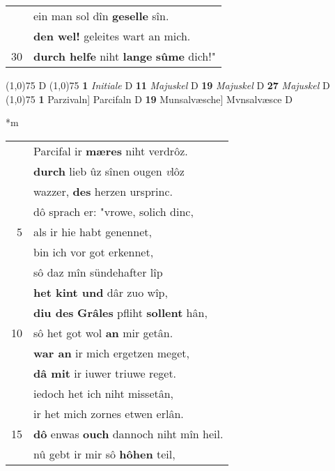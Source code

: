 \documentclass[8pt,a4paper,notitlepage]{article}
\begin{document}
\begin{table}[ht]
\begin{minipage}[t]{0.5\linewidth}
\begin{tabular}{rl}
 & ein man sol dîn \textbf{geselle} sîn.\\ 
 & \textbf{den wel!} geleites wart an mich.\\ 
30 & \textbf{durch helfe} niht \textbf{lange} \textbf{sûme} dich!"\\ 
\end{tabular}
\scriptsize
\line(1,0){75} \newline
D \newline
\line(1,0){75} \newline
\textbf{1} \textit{Initiale} D  \textbf{11} \textit{Majuskel} D  \textbf{19} \textit{Majuskel} D  \textbf{27} \textit{Majuskel} D  \newline
\line(1,0){75} \newline
\textbf{1} Parzivaln] Parcifaln D \textbf{19} Munsalvæsche] Mvnsalvæsce D \newline
\end{minipage}
\hspace{0.5cm}
\begin{minipage}[t]{0.5\linewidth}
\small
\begin{center}*m
\end{center}
\begin{tabular}{rl}
 & Parcifal ir \textbf{mæres} niht verdrôz.\\ 
 & \textbf{durch} lieb ûz sînen ougen \textit{v}lôz\\ 
 & wazzer, \textbf{des} herzen ursprinc.\\ 
 & dô sprach er: "vrowe, solich dinc,\\ 
5 & als ir hie habt genennet,\\ 
 & bin ich vor got erkennet,\\ 
 & sô daz mîn sündehafter lîp\\ 
 & \textbf{het kint und} dâr zuo wîp,\\ 
 & \textbf{diu des} \textbf{Grâles} pfliht \textbf{sollent} hân,\\ 
10 & sô het got wol \textbf{an} mir getân.\\ 
 & \textbf{war an} ir mich ergetzen meget,\\ 
 & \textbf{dâ mit} ir iuwer triuwe reget.\\ 
 & iedoch het ich niht missetân,\\ 
 & ir het mich zornes etwen erlân.\\ 
15 & \textbf{dô} enwas \textbf{ouch} dannoch niht mîn heil.\\ 
 & nû gebt ir mir sô \textbf{hôhen} teil,\\ 

\end{tabular}
\end{minipage}
\end{table}
\end{document}
